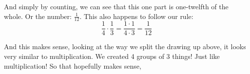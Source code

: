 \documentclass{article}
\begin{document}
And simply by counting, we can see that this one part is one-twelfth of the whole. Or the number: $\frac{1}{12}$. This also happens to follow our rule:
\[ \frac{1}{4} \cdot \frac{1}{3} = \frac{1\cdot 1}{4\cdot 3} = \frac{1}{12}  \]

And this makes sense, looking at the way we split the drawing up above, it looks very similar to multiplication. We created 4 groups of 3 things! Just like multiplication! So that hopefully makes sense, 
\end{document}
